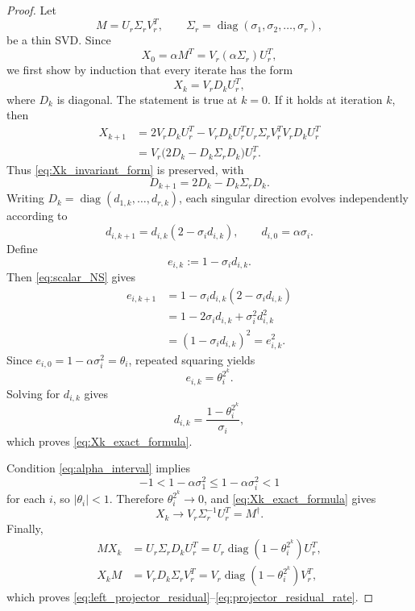 \documentclass[12pt,a4paper]{article}
\theoremstyle{plain}
\theoremstyle{definition}
\theoremstyle{remark}
\begin{document}
\begin{proof}
Let
\[
    M=U_r\Sigma_rV_r^T, \qquad \Sigma_r=\operatorname{diag}(\sigma_1,\sigma_2,\ldots,\sigma_r),
\]
be a thin SVD. Since
\[
    X_0=\alpha M^T =V_r(\alpha\Sigma_r)U_r^T,
\]
we first show by induction that every iterate has the form
\begin{equation} \label{eq:Xk_invariant_form}
    X_k=V_rD_kU_r^T,
\end{equation}
where \(D_k\) is diagonal. The statement is true at \(k=0\). If it holds at iteration \(k\), then
\begin{align*}
    X_{k+1}
    & =2V_rD_kU_r^T -V_rD_kU_r^T U_r\Sigma_rV_r^T V_rD_kU_r^T
    \\& =V_r\bigl(2D_k-D_k\Sigma_rD_k\bigr)U_r^T.
\end{align*}
Thus \eqref{eq:Xk_invariant_form} is preserved, with
\[
    D_{k+1}=2D_k-D_k\Sigma_rD_k.
\]
Writing \(D_k=\operatorname{diag}(d_{1,k},\ldots,d_{r,k})\), each singular direction evolves independently according to
\begin{equation} \label{eq:scalar_NS}
    d_{i,k+1}=d_{i,k}(2-\sigma_i d_{i,k}), \qquad d_{i,0}=\alpha\sigma_i.
\end{equation}
Define
\[
    e_{i,k}:=1-\sigma_i d_{i,k}.
\]
Then \eqref{eq:scalar_NS} gives
\begin{align*}
    e_{i,k+1}
    &=1-\sigma_i d_{i,k}(2-\sigma_i d_{i,k})\\
    &=1-2\sigma_i d_{i,k}+\sigma_i^2d_{i,k}^2\\
    &=(1-\sigma_i d_{i,k})^2 =e_{i,k}^2.
\end{align*}
Since \(e_{i,0}=1-\alpha\sigma_i^2=\theta_i\), repeated squaring yields
\[
    e_{i,k}=\theta_i^{2^k}.
\]
Solving for \(d_{i,k}\) gives
\[
    d_{i,k}=\frac{1-\theta_i^{2^k}}{\sigma_i},
\]
which proves \eqref{eq:Xk_exact_formula}.

Condition \eqref{eq:alpha_interval} implies
\[
    -1<1-\alpha\sigma_1^2 \leq 1-\alpha\sigma_i^2<1
\]
for each \(i\), so \(|\theta_i|<1\). Therefore \(\theta_i^{2^k}\to0\), and \eqref{eq:Xk_exact_formula} gives
\[
    X_k\longrightarrow V_r\Sigma_r^{-1}U_r^T =M^\dagger.
\]
Finally,
\begin{align*}
    MX_k &=U_r\Sigma_rD_kU_r^T =U_r\operatorname{diag}(1-\theta_i^{2^k})U_r^T,
    \\ X_kM &=V_rD_k\Sigma_rV_r^T =V_r\operatorname{diag}(1-\theta_i^{2^k})V_r^T,
\end{align*}
which proves \eqref{eq:left_projector_residual}--\eqref{eq:projector_residual_rate}.
\end{proof}
\end{document}
